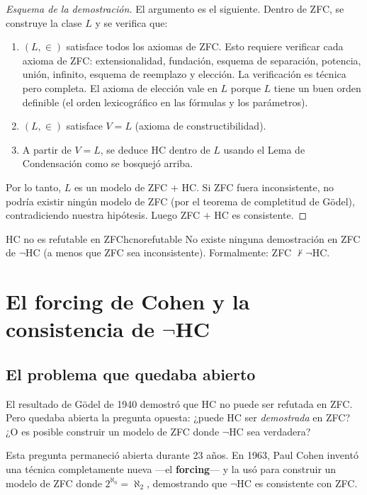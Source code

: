 \begin{proof}[Esquema de la demostración]
El argumento es el siguiente. Dentro de ZFC, se construye la clase $L$ y se verifica que:
\begin{enumerate}[leftmargin=2em, label=(\roman*)]
  \item $(L, \in)$ satisface todos los axiomas de ZFC. Esto requiere verificar cada axioma de ZFC: extensionalidad, fundación, esquema de separación, potencia, unión, infinito, esquema de reemplazo y elección. La verificación es técnica pero completa. El axioma de elección vale en $L$ porque $L$ tiene un buen orden definible (el orden lexicográfico en las fórmulas y los parámetros).
  \item $(L, \in)$ satisface $V = L$ (axioma de constructibilidad).
  \item A partir de $V = L$, se deduce HC dentro de $L$ usando el Lema de Condensación como se bosquejó arriba.
\end{enumerate}
Por lo tanto, $L$ es un modelo de ZFC $+$ HC. Si ZFC fuera inconsistente, no podría existir ningún modelo de ZFC (por el teorema de completitud de Gödel), contradiciendo nuestra hipótesis. Luego ZFC $+$ HC es consistente.
\end{proof}

\begin{corolario}{HC no es refutable en ZFC}{hcnorefutable}
No existe ninguna demostración en ZFC de $\neg\mathrm{HC}$ (a menos que ZFC sea inconsistente). Formalmente: ZFC $\not\vdash \neg\mathrm{HC}$.
\end{corolario}

\section{El forcing de Cohen y la consistencia de \texorpdfstring{$\neg$HC}{negHC}}

\subsection{El problema que quedaba abierto}

El resultado de Gödel de 1940 demostró que HC no puede ser refutada en ZFC. Pero quedaba abierta la pregunta opuesta: ¿puede HC ser \emph{demostrada} en ZFC? ¿O es posible construir un modelo de ZFC donde $\neg$HC sea verdadera?

Esta pregunta permaneció abierta durante 23 años. En 1963, Paul Cohen inventó una técnica completamente nueva —el \textbf{forcing}— y la usó para construir un modelo de ZFC donde $2^{\aleph_0} = \aleph_2$, demostrando que $\neg$HC es consistente con ZFC.

